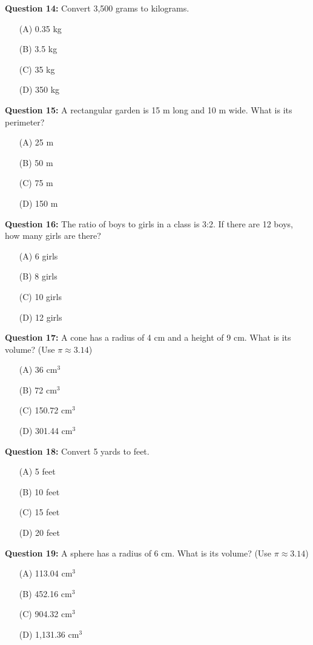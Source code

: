 \documentclass[12pt, letterpaper]{article}
\begin{document}
\noindent
\textbf{Question 14:} Convert 3,500 grams to kilograms.
\begin{itemize}
    \item[(A)] 0.35 kg
    \item[(B)] 3.5 kg
    \item[(C)] 35 kg
    \item[(D)] 350 kg
\end{itemize}

\noindent
\textbf{Question 15:} A rectangular garden is 15 m long and 10 m wide. What is its perimeter?
\begin{itemize}
    \item[(A)] 25 m
    \item[(B)] 50 m
    \item[(C)] 75 m
    \item[(D)] 150 m
\end{itemize}

\noindent
\textbf{Question 16:} The ratio of boys to girls in a class is 3:2. If there are 12 boys, how many girls are there?
\begin{itemize}
    \item[(A)] 6 girls
    \item[(B)] 8 girls
    \item[(C)] 10 girls
    \item[(D)] 12 girls
\end{itemize}

\noindent
\textbf{Question 17:} A cone has a radius of 4 cm and a height of 9 cm. What is its volume? (Use $\pi \approx 3.14$)
\begin{itemize}
    \item[(A)] 36 cm$^3$
    \item[(B)] 72 cm$^3$
    \item[(C)] 150.72 cm$^3$
    \item[(D)] 301.44 cm$^3$
\end{itemize}

\noindent
\textbf{Question 18:} Convert 5 yards to feet.
\begin{itemize}
    \item[(A)] 5 feet
    \item[(B)] 10 feet
    \item[(C)] 15 feet
    \item[(D)] 20 feet
\end{itemize}

\noindent
\textbf{Question 19:} A sphere has a radius of 6 cm. What is its volume? (Use $\pi \approx 3.14$)
\begin{itemize}
    \item[(A)] 113.04 cm$^3$
    \item[(B)] 452.16 cm$^3$
    \item[(C)] 904.32 cm$^3$
    \item[(D)] 1,131.36 cm$^3$
\end{itemize}
\end{document}

